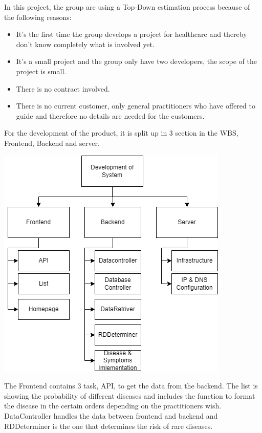 In this project, the group are using a Top-Down estimation process because of the following reasons:
\begin{itemize}
	\item It's the first time the group develops a project for healthcare and thereby don't know completely what is involved yet.
	\item It's a small project and the group only have two developers, the scope of the project is small.
	\item There is no contract involved.
	\item There is no current customer, only general practitioners who have offered to guide and therefore no details are needed for the customers.
\end{itemize}
For the development of the product, it is split up in 3 section in the WBS, Frontend, Backend and server. 
\begin{center}
	\includegraphics[width=.5\columnwidth]{./WBS}
\end{center}
The Frontend contains 3 task, API, to get the data from the backend. The list is showing the probability of different diseases and includes the function to format the disease in the certain orders depending on the practitioners wish. DataController handles the data between frontend and backend and RDDeterminer is the one that determines the risk of rare diseases.


